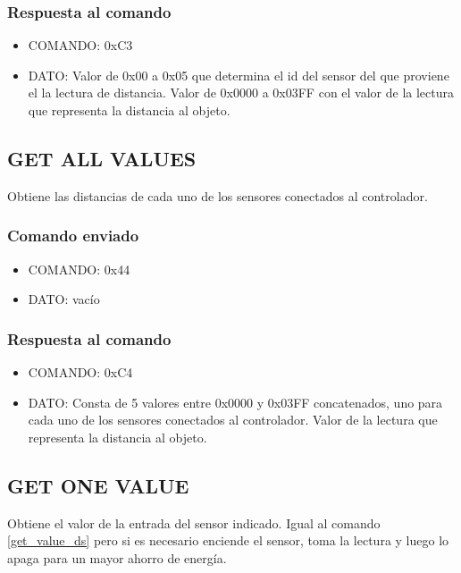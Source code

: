 \documentclass[a4paper,10pt]{article}
\begin{document}
\subsubsection*{Respuesta al comando}

\begin{itemize}
	\item{COMANDO:} 0xC3
	\item{DATO:} Valor de 0x00 a 0x05 que determina el id del sensor del que proviene el la lectura de distancia.
	Valor de 0x0000 a 0x03FF con el valor de la lectura que representa la distancia al objeto.
\end{itemize}

\subsection{GET ALL VALUES}
\label{get_all_values_ds}

Obtiene las distancias de cada uno de los sensores conectados al controlador.

\subsubsection*{Comando enviado}

\begin{itemize}
	\item{COMANDO:} 0x44
	\item{DATO:} vac\'io
\end{itemize}

\subsubsection*{Respuesta al comando}

\begin{itemize}
	\item{COMANDO:} 0xC4
	\item{DATO:} Consta de 5 valores entre 0x0000 y 0x03FF concatenados, uno para cada uno de los sensores conectados al controlador.
	Valor de la lectura que representa la distancia al objeto.
\end{itemize}

\subsection{GET ONE VALUE}
\label{get_one_value_ds}

Obtiene el valor de la entrada del sensor indicado.
Igual al comando \ref{get_value_ds} pero si es necesario enciende el sensor, toma la lectura y luego lo apaga para un mayor ahorro de energ\'ia.
\end{document}
